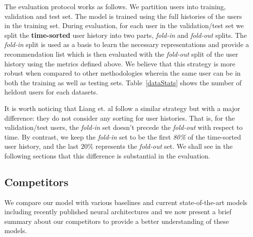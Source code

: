 \documentclass[sigconf]{acmart}
\numberwithin{equation}{section}
\begin{document}
The evaluation protocol works as follows.
We partition users into training, validation and test set. The
model is trained using the full histories of the users in the training
set. During evaluation, for each user in the validation/test
set we split the \textbf{time-sorted} user history into two parts,
\textit{fold-in} and \textit{fold-out} splits. The \textit{fold-in}
split is used as a basis to learn the necessary representations and provide a
recommendation list which is then evaluated with the \textit{fold-out} split
of the user history using the metrics defined above. 
We believe that this strategy is more robust when compared to
other methodologies wherein the same user can be in both the training
as well as testing sets. Table~\ref{dataStats} shows the number of
heldout users for each datasets. 

It is worth noticing that Liang et. al
\cite{Liang:2018:VAC:3178876.3186150} follow a similar strategy but
with a major difference: they do not consider any sorting for user
histories. That is, for the validation/test users, the \textit{fold-in}
set doesn't precede the \textit{fold-out} with respect to time. By
contrast, we keep the
\textit{fold-in} set to be the first \textit{80\%} of the time-sorted
user history, and the last $20\%$ represents the \textit{fold-out} set. We
shall see in the following sections that this difference is substantial in the
evaluation. 

\subsection{Competitors}
We compare our model with various baselines and current
state-of-the-art models including recently published neural 
architectures and we now present a brief summary about our
competitors to provide a better understanding of these models. 
\end{document}
